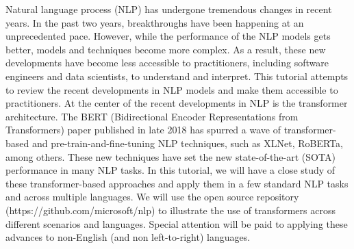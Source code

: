 Natural language process (NLP) has undergone tremendous changes in recent years. In the past two years, breakthroughs have been happening at an unprecedented pace.  However, while the performance of the NLP models gets better, models and techniques become more complex. As a result, these new developments have become less accessible to practitioners, including software engineers and data scientists, to understand and interpret. This tutorial attempts to review the recent developments in NLP models and make them accessible to practitioners. At the center of the recent developments in NLP is the transformer architecture. The BERT (Bidirectional Encoder Representations from Transformers) paper published in late 2018 has spurred a wave of transformer-based and pre-train-and-fine-tuning NLP techniques, such as XLNet, RoBERTa, among others. These new techniques have set the new state-of-the-art (SOTA) performance in many NLP tasks. In this tutorial, we will have a close study of these transformer-based approaches and apply them in a few standard NLP tasks and across multiple languages.  We will use the open source repository (https://github.com/microsoft/nlp) to illustrate the use of transformers across different scenarios and languages. Special attention will be paid to applying these advances to non-English (and non left-to-right) languages.
